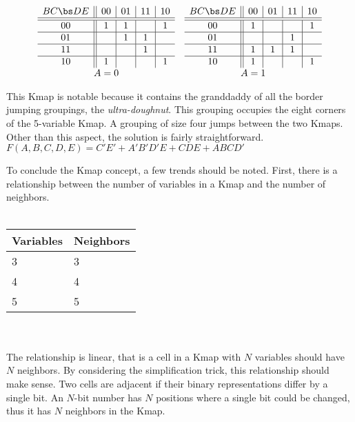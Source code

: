 $$
\begin{array}{cc}
\begin{array} {c||c|c|c|c}
BC \bs DE & 00 & 01 & 11 & 10 \\ \hline \hline
00        & 1  & 1  &    & 1  \\ \hline
01        &    & 1  & 1  &    \\ \hline
11        &    &    & 1  &    \\ \hline
10        & 1  &    &    & 1  \\
\end{array}
&
\begin{array} {c||c|c|c|c}
BC \bs DE & 00 & 01 & 11 & 10 \\ \hline \hline
00        & 1  &    &    & 1  \\ \hline
01        &    &    & 1  &    \\ \hline
11        & 1  & 1  & 1  &    \\ \hline
10        & 1  &    &    & 1  \\
\end{array} \\
A=0 & A=1 \\
\end{array}
$$

This Kmap is notable because it contains the granddaddy of all the
border jumping groupings, the  \textit{ultra-doughnut}.
This grouping occupies the eight corners of the 5-variable Kmap.
A grouping of size four jumps between the two Kmaps.
Other than this aspect, the solution is fairly straightforward.
$F(A,B,C,D,E)=C'E'+A'B'D'E+CDE+ABCD'$

To conclude the Kmap concept, a few trends
should be noted.  First, there is a relationship between the
number of variables in a Kmap and the number of neighbors.
\\ \\
\begin{tabular}{l|l}
Variables & Neighbors    \\ \hline
3      &  3        \\ \hline
4      &  4        \\ \hline
5      &  5        \\
\end{tabular}
\\ \\
The relationship is linear, that is a cell in a Kmap with
$N$ variables should have $N$ neighbors.   By considering
the simplification trick, this relationship should make sense. Two cells
are adjacent if their binary representations differ by a single
bit.  An $N$-bit number has $N$ positions where a single bit
could be changed, thus it has $N$ neighbors in the Kmap.

